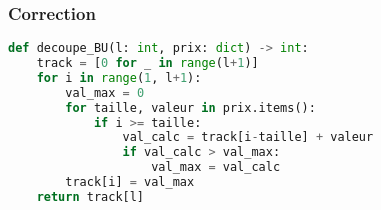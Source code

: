 \documentclass[svgnames,11pt]{beamer}
\begin{document}
\begin{frame}[fragile]
    \frametitle{Correction}
\begin{center}
\begin{lstlisting}[language=Python , basicstyle=\ttfamily\small, xleftmargin=0.2em, xrightmargin=0em]
def decoupe_BU(l: int, prix: dict) -> int:
    track = [0 for _ in range(l+1)]
    for i in range(1, l+1):
        val_max = 0
        for taille, valeur in prix.items():
            if i >= taille:
                val_calc = track[i-taille] + valeur
                if val_calc > val_max:
                    val_max = val_calc
        track[i] = val_max
    return track[l]
\end{lstlisting}
\end{center}
    

\end{frame}
\end{document}
